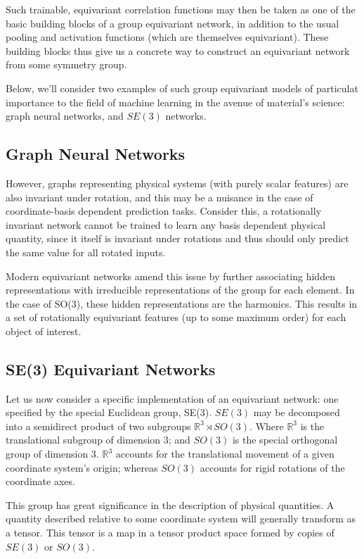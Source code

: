 \documentclass[10pt,a4paper]{article}
\begin{document}
Such trainable, equivariant correlation functions may then be taken as one of the basic building blocks of a group equivariant network, in addition to the usual pooling and activation functions (which are themselves equivariant). These building blocks thus give us a concrete way to construct an equivariant network from some symmetry group.

Below, we'll consider two examples of such group equivariant models of particulat importance to the field of machine learning in the avenue of material's science: graph neural networks, and $SE(3)$ networks.

\subsection{Graph Neural Networks}


However, graphs representing physical systems (with purely scalar features) are also invariant under rotation, and this may be a nuisance in the case of coordinate-basis dependent prediction tasks. Consider this, a rotationally invariant network cannot be trained to learn any basis dependent physical quantity, since it itself is invariant under rotations and thus should only predict the same value for all rotated inputs.

Modern equivariant networks amend this issue by further associating hidden representations with irreducible representations of the group for each element. In the case of SO(3), these hidden representations are the harmonics. This results in a set of rotationally equivariant features (up to some maximum order) for each object of interest.


\subsection{SE(3) Equivariant Networks}
Let us now consider a specific implementation of an equivariant network: one specified by the special Euclidean group, SE(3). $SE(3)$ may be decomposed into a semidirect product of two subgroups $\mathbb{R}^3\rtimes SO(3)$. Where $\mathbb{R}^3$ is the translational subgroup of dimension 3; and $SO(3)$ is the special orthogonal group of dimension 3. $\mathbb{R}^3$ accounts for the translational movement of a given coordinate system's origin; whereas $SO(3)$ accounts for rigid rotations of the coordinate axes.

This group has great significance in the description of physical quantities. A quantity described relative to some coordinate system will generally transform as a tensor. This tensor is a map in a tensor product space formed by copies of $SE(3)$ or $SO(3)$.
\end{document}
